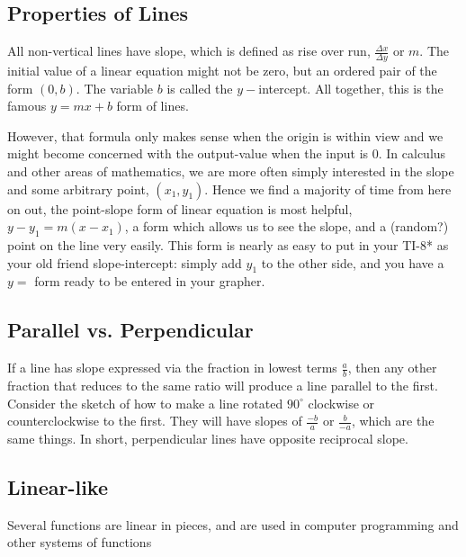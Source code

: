 \subsection{Properties of Lines}



All non-vertical lines have slope, which is defined as rise over run, $\frac{\Delta x}{\Delta y}$ 
or $m$.  The initial value
of a linear equation might not be zero, but an ordered pair of the form $(0,b)$.  The variable
$b$ is called the $y-$intercept.  All together, this is the famous $y=mx+b$ form of lines.

However, that formula only makes sense when the origin is within view and we might become 
concerned with the output-value when the input is 0. In calculus and other areas of mathematics, 
we are more
often simply interested in the slope and some arbitrary point, $(x_1,y_1)$.  Hence we find a majority
of time from here on out, the point-slope form of 
linear equation is most helpful, $y-y_1=m(x-x_1)$,
a form which allows us to see the slope, and a (random?) point on the line very easily.
This form is nearly as easy to put in your TI-8* as your old friend slope-intercept: simply add $y_1$
to the other side, and you have a $y=$ form ready to be entered in your grapher.

\subsection{Parallel vs. Perpendicular}
If a line has slope expressed via the fraction in lowest terms $\frac{a}{b}$, 
then any other fraction that reduces to the same ratio will produce a line parallel to the first.  
Consider the sketch of how to make a line rotated $90^\circ$ clockwise or counterclockwise 
to the first.  They will have slopes of $\frac{-b}{a}$ or $\frac{b}{-a}$, which are the same
things.  In short, perpendicular lines have opposite reciprocal slope.

\subsection{Linear-like}
Several functions are linear in pieces, and are used in computer programming and other
systems of functions

